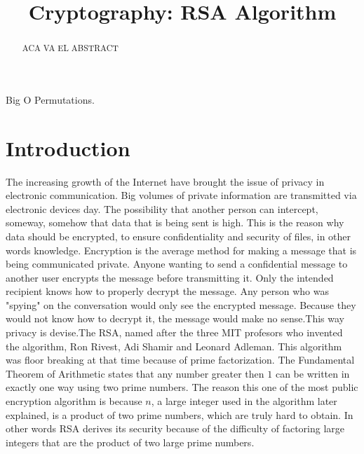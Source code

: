 \documentclass[conference]{IEEEtran}
\begin{document}
\title{Cryptography: RSA Algorithm}
\author{
\and
{}
}
\maketitle
\begin{abstract}
ACA VA EL ABSTRACT
\end{abstract}
\begin{IEEEkeywords}
Big O Permutations.
\end{IEEEkeywords}
\section{Introduction}
The increasing growth of the Internet have brought the issue of privacy in electronic communication. Big volumes of private information are transmitted via electronic devices day. The possibility that another person can intercept, someway, somehow that data that is being sent is high. This is the reason why data should be encrypted, to ensure confidentiality and security of files, in other words knowledge.\newline
Encryption is the average method for making a message that is being communicated private. Anyone wanting to send a confidential message to another user encrypts the message before transmitting it. Only the intended recipient knows how to properly decrypt the message. Any person who was "spying" on the conversation would only see the encrypted message. Because they would not know how to decrypt it, the message would make no sense.This way privacy is devise.\newline The RSA, named after the three MIT profesors who invented the algorithm, Ron Rivest, Adi Shamir and Leonard Adleman. This algorithm was floor breaking at that time because of prime factorization. The Fundamental Theorem of Arithmetic states that any number greater then $1$ can be written in exactly one way using two prime numbers. The reason this one of the most public encryption algorithm is because $n$, a large integer used in the algorithm later explained, is a product of two prime numbers, which are truly hard to obtain. In other words RSA derives its security because of the difficulty of factoring large integers that are the product of two large prime numbers.
\end{document}
